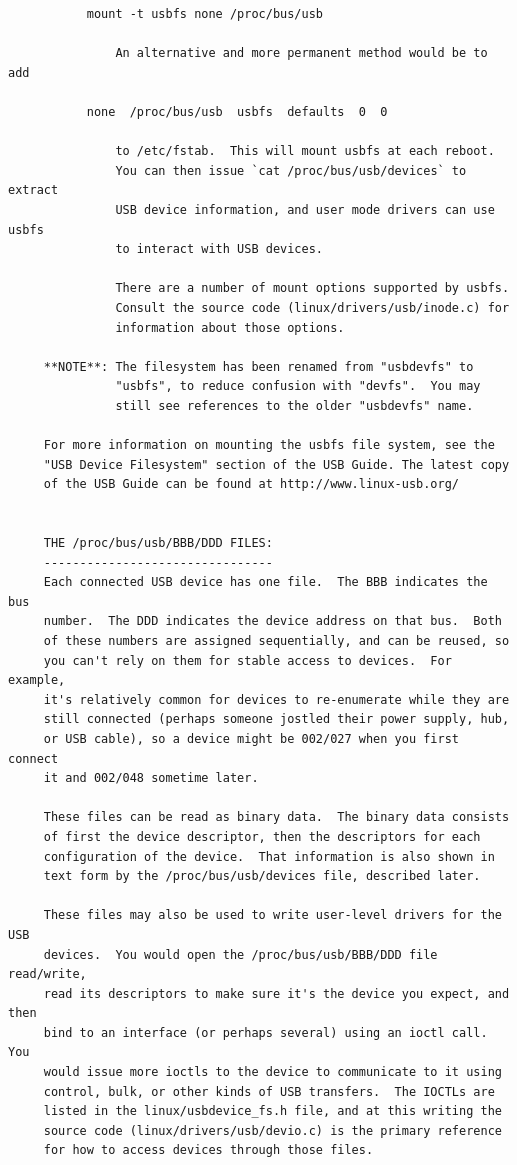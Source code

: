 {{{{{{{{{{{{{{{{{\begin{verbatim}
           mount -t usbfs none /proc/bus/usb
     
               An alternative and more permanent method would be to add
     
           none  /proc/bus/usb  usbfs  defaults  0  0
     
               to /etc/fstab.  This will mount usbfs at each reboot.
               You can then issue `cat /proc/bus/usb/devices` to extract
               USB device information, and user mode drivers can use usbfs
               to interact with USB devices.
     
               There are a number of mount options supported by usbfs.
               Consult the source code (linux/drivers/usb/inode.c) for
               information about those options.
     
     **NOTE**: The filesystem has been renamed from "usbdevfs" to
               "usbfs", to reduce confusion with "devfs".  You may
               still see references to the older "usbdevfs" name.
     
     For more information on mounting the usbfs file system, see the
     "USB Device Filesystem" section of the USB Guide. The latest copy
     of the USB Guide can be found at http://www.linux-usb.org/
     
     
     THE /proc/bus/usb/BBB/DDD FILES:
     --------------------------------
     Each connected USB device has one file.  The BBB indicates the bus
     number.  The DDD indicates the device address on that bus.  Both
     of these numbers are assigned sequentially, and can be reused, so
     you can't rely on them for stable access to devices.  For example,
     it's relatively common for devices to re-enumerate while they are
     still connected (perhaps someone jostled their power supply, hub,
     or USB cable), so a device might be 002/027 when you first connect
     it and 002/048 sometime later.
     
     These files can be read as binary data.  The binary data consists
     of first the device descriptor, then the descriptors for each
     configuration of the device.  That information is also shown in
     text form by the /proc/bus/usb/devices file, described later.
     
     These files may also be used to write user-level drivers for the USB
     devices.  You would open the /proc/bus/usb/BBB/DDD file read/write,
     read its descriptors to make sure it's the device you expect, and then
     bind to an interface (or perhaps several) using an ioctl call.  You
     would issue more ioctls to the device to communicate to it using
     control, bulk, or other kinds of USB transfers.  The IOCTLs are
     listed in the linux/usbdevice_fs.h file, and at this writing the
     source code (linux/drivers/usb/devio.c) is the primary reference
     for how to access devices through those files.
     

\end{verbatim}}}}}}}}}}}}}}}}}}
